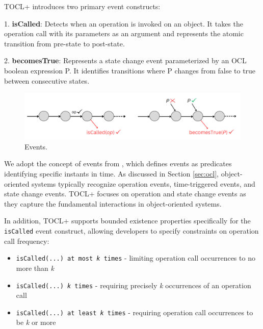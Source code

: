 TOCL+ introduces two primary event constructs:

1. \textbf{isCalled}: Detects when an operation is invoked on an object. It takes 
the operation call with its parameters as an argument and represents the atomic 
transition from pre-state to post-state.

2. \textbf{becomesTrue}: Represents a state change event parameterized by an OCL 
boolean expression P. It identifies transitions where P changes from false to true 
between consecutive states.

\begin{figure}
    \centering
    \includegraphics[width=1\textwidth]{figures/c2/events_visual.png}
    \caption{Events.}
    \label{fig:event_constructs}
\end{figure}

We adopt the concept of events from \cite{TOCL_Taha}, which defines events 
as predicates identifying specific instants in time. As discussed in Section 
\ref{sec:ocl}, object-oriented systems typically recognize operation events, 
time-triggered events, and state change events. TOCL+ focuses on operation and 
state change events as they capture the fundamental interactions in object-oriented 
systems.

In addition, TOCL+ supports bounded existence properties specifically for the 
\texttt{isCalled} event construct, allowing developers to specify constraints on 
operation call frequency:
\begin{itemize}
    \item \texttt{isCalled(...) at most \textit{k} times} - limiting operation call occurrences to no more than \textit{k}
    \item \texttt{isCalled(...) \textit{k} times} - requiring precisely \textit{k} occurrences of an operation call
    \item \texttt{isCalled(...) at least \textit{k} times} - requiring operation call occurrences to be \textit{k} or more
\end{itemize}

